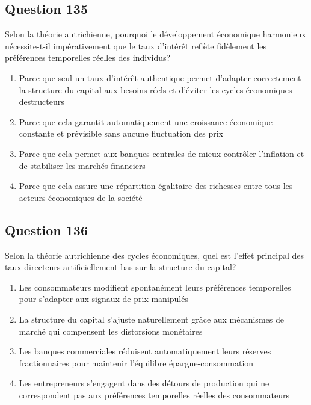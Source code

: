 \documentclass[12pt,a4paper]{article}
\begin{document}
\bigskip


\subsection*{Question 135}
Selon la théorie autrichienne, pourquoi le développement économique harmonieux nécessite-t-il impérativement que le taux d'intérêt reflète fidèlement les préférences temporelles réelles des individus?

\begin{enumerate}[label=\Alph*., leftmargin=*]
\item Parce que seul un taux d'intérêt authentique permet d'adapter correctement la structure du capital aux besoins réels et d'éviter les cycles économiques destructeurs
\item Parce que cela garantit automatiquement une croissance économique constante et prévisible sans aucune fluctuation des prix
\item Parce que cela permet aux banques centrales de mieux contrôler l'inflation et de stabiliser les marchés financiers
\item Parce que cela assure une répartition égalitaire des richesses entre tous les acteurs économiques de la société
\end{enumerate}

\bigskip


\subsection*{Question 136}
Selon la théorie autrichienne des cycles économiques, quel est l'effet principal des taux directeurs artificiellement bas sur la structure du capital?

\begin{enumerate}[label=\Alph*., leftmargin=*]
\item Les consommateurs modifient spontanément leurs préférences temporelles pour s'adapter aux signaux de prix manipulés
\item La structure du capital s'ajuste naturellement grâce aux mécanismes de marché qui compensent les distorsions monétaires
\item Les banques commerciales réduisent automatiquement leurs réserves fractionnaires pour maintenir l'équilibre épargne-consommation
\item Les entrepreneurs s'engagent dans des détours de production qui ne correspondent pas aux préférences temporelles réelles des consommateurs
\end{enumerate}
\end{document}
